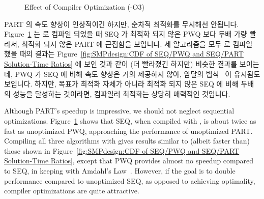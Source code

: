 \fi

\begin{figure}[tb]
\centering
{}
\caption{Effect of Compiler Optimization (-O3)}
\label{fig:SMPdesign:Effect of Compiler Optimization (-O3)}
\end{figure}

PART 의 속도 향상이 인상적이긴 하지만, 순차적 최적화를 무시해선 안됩니다.
Figure~\ref{fig:SMPdesign:Effect of Compiler Optimization (-O3)} 는  로
컴파일 되었을 때 SEQ 가 최적화 되지 않은 PWQ 보다 두배 가량 빨라서, 최적화 되지
않은 PART 에 근접함을 보입니다.
세 알고리즘을 모두  로 컴파일 했을 때의 결과는
Figure~\ref{fig:SMPdesign:CDF of SEQ/PWQ and SEQ/PART Solution-Time Ratios}
에 보인 것과 같이 (더 빨라졌긴 하지만) 비슷한 결과를 보이는데, PWQ 가 SEQ 에
비해 속도 향상은 거의 제공하지 않아, 암달의
법칙~\cite{GeneAmdahl1967AmdahlsLaw} 이 유지됨도 보입니다.
하지만, 목표가 최적화 자체가 아니라 최적화 되지 않은 SEQ 에 비해 두배의 성능을
달성하는 것이라면, 컴파일러 최적화는 상당히 매력적인 것입니다.

\iffalse

Although PART's speedup is impressive, we should not neglect sequential
optimizations.
Figure~\ref{fig:SMPdesign:Effect of Compiler Optimization (-O3)} shows that
SEQ, when compiled with , is about twice as fast
as unoptimized PWQ, approaching the performance of unoptimized PART\@.
Compiling all three algorithms with  gives results similar to
(albeit faster than) those shown in
Figure~\ref{fig:SMPdesign:CDF of SEQ/PWQ and SEQ/PART Solution-Time Ratios},
except that PWQ provides almost no speedup compared
to SEQ, in keeping with Amdahl's Law~\cite{GeneAmdahl1967AmdahlsLaw}.
However, if the goal is to double performance compared to unoptimized
SEQ, as opposed to achieving optimality, compiler
optimizations are quite attractive.

